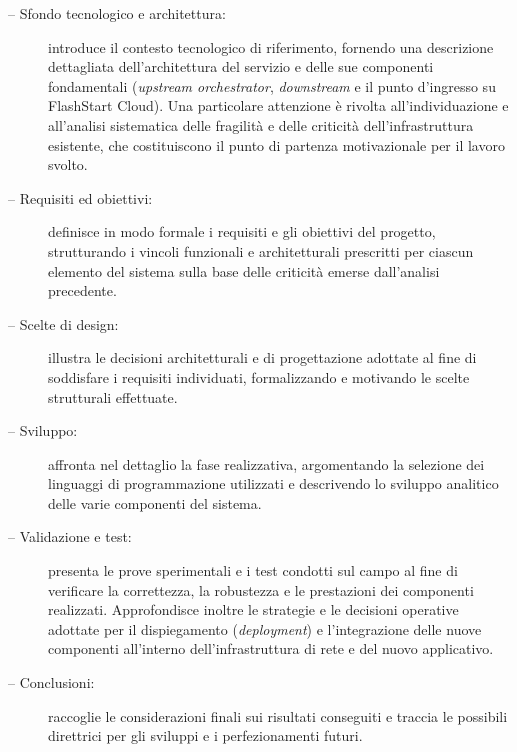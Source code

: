 \begin{description}
    \item[ -- Sfondo tecnologico e architettura:] introduce il contesto tecnologico di riferimento, fornendo una descrizione dettagliata dell'architettura del servizio e delle sue componenti fondamentali (\emph{upstream orchestrator}, \emph{downstream} e il punto d'ingresso su FlashStart Cloud). Una particolare attenzione è rivolta all'individuazione e all'analisi sistematica delle fragilità e delle criticità dell'infrastruttura esistente, che costituiscono il punto di partenza motivazionale per il lavoro svolto.
    
    \item[ -- Requisiti ed obiettivi:] definisce in modo formale i requisiti e gli obiettivi del progetto, strutturando i vincoli funzionali e architetturali prescritti per ciascun elemento del sistema sulla base delle criticità emerse dall'analisi precedente.
    
    \item[ -- Scelte di design:] illustra le decisioni architetturali e di progettazione adottate al fine di soddisfare i requisiti individuati, formalizzando e motivando le scelte strutturali effettuate.
    
    \item[ -- Sviluppo:] affronta nel dettaglio la fase realizzativa, argomentando la selezione dei linguaggi di programmazione utilizzati e descrivendo lo sviluppo analitico delle varie componenti del sistema.
    
    \item[ -- Validazione e test:] presenta le prove sperimentali e i test condotti sul campo al fine di verificare la correttezza, la robustezza e le prestazioni dei componenti realizzati. Approfondisce inoltre le strategie e le decisioni operative adottate per il dispiegamento (\emph{deployment}) e l'integrazione delle nuove componenti all'interno dell'infrastruttura di rete e del nuovo applicativo.
    
    \item[ -- Conclusioni:] raccoglie le considerazioni finali sui risultati conseguiti e traccia le possibili direttrici per gli sviluppi e i perfezionamenti futuri.
\end{description}